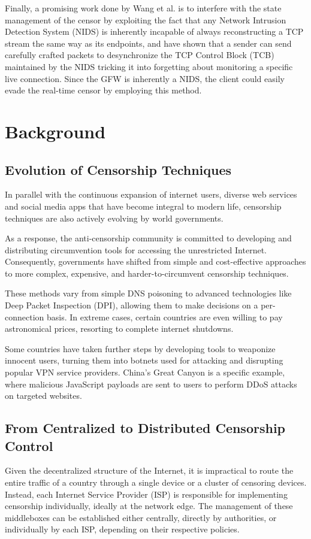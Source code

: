 Finally, a promising work done by Wang et al. is to interfere with the state management of the censor by exploiting the fact that any Network Intrusion Detection System (NIDS) is inherently incapable of always reconstructing a TCP stream the same way as its endpoints, and have shown that a sender can send carefully crafted packets to desynchronize the TCP Control Block (TCB) maintained by the NIDS tricking it into forgetting about monitoring a specific live connection. Since the GFW is inherently a NIDS, the client could easily evade the real-time censor by employing this method.\cite{wang2017state}

\section{Background}
\subsection{Evolution of Censorship Techniques}
In parallel with the continuous expansion of internet users, diverse web services and social media apps that have become integral to modern life, censorship techniques are also actively evolving by world governments. 

As a response, the anti-censorship community is committed to developing and distributing circumvention tools for accessing the unrestricted Internet. Consequently, governments have shifted from simple and cost-effective approaches to more complex, expensive, and harder-to-circumvent censorship techniques.

These methods vary from simple DNS poisoning to advanced technologies like Deep Packet Inspection (DPI), allowing them to make decisions on a per-connection basis. In extreme cases, certain countries are even willing to pay astronomical prices, resorting to complete internet shutdowns.

Some countries have taken further steps by developing tools to weaponize innocent users, turning them into botnets used for attacking and disrupting popular VPN service providers. China's Great Canyon is a specific example, where malicious JavaScript payloads are sent to users to perform DDoS attacks on targeted websites.\cite{marczak2015great}

\subsection{From Centralized to Distributed Censorship Control}
Given the decentralized structure of the Internet, it is impractical to route the entire traffic of a country through a single device or a cluster of censoring devices. Instead, each Internet Service Provider (ISP) is responsible for implementing censorship individually, ideally at the network edge. The management of these middleboxes can be established either centrally, directly by authorities, or individually by each ISP, depending on their respective policies.

